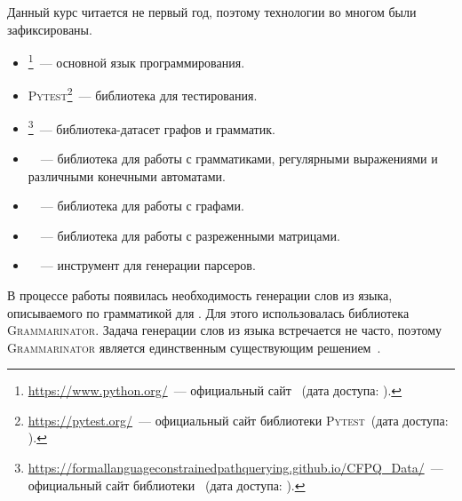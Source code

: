 Данный курс читается не первый год, поэтому технологии во многом были зафиксированы.
\begin{itemize}
    \item \python{}\footnote{\url{https://www.python.org/}~--- официальный сайт \python{}~(дата доступа: ).}~--- основной язык программирования.
    \item \textsc{Pytest}\footnote{\url{https://pytest.org/}~--- официальный сайт библиотеки \textsc{Pytest}~(дата доступа: ).}~--- библиотека для тестирования.
    \item \cfpqdata{}\footnote{\url{https://formallanguageconstrainedpathquerying.github.io/CFPQ_Data/}~--- официальный сайт библиотеки \cfpqdata{}~(дата доступа: ).}~--- библиотека-датасет графов и грамматик.
    \item \pyformlang{}~\cite{romeroPyformlangEducationalLibrary2021}~--- библиотека для работы с грамматиками, регулярными выражениями и различными конечными автоматами.
    \item \networkx{}~\cite{SciPyProceedings_11}~--- библиотека для работы с графами.
    \item \scipy{}~\cite{virtanenSciPyFundamentalAlgorithms2020}~--- библиотека для работы с разреженными матрицами.
    \item \antlr{}~\cite{parrDefinitiveANTLRReference2013}~--- инструмент для генерации парсеров.
\end{itemize}

В процессе работы появилась необходимость генерации слов из языка, описываемого по грамматикой для \antlr{}.
Для этого использовалась библиотека \textsc{Grammarinator}.
Задача генерации слов из языка встречается не часто, поэтому \textsc{Grammarinator} является единственным существующим решением~\cite{GeneratingGrammarconformantTexts}.
